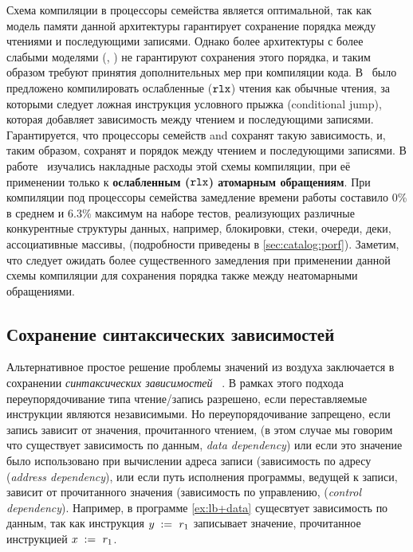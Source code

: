 Схема компиляции в процессоры семейства \Intel
является оптимальной, так как модель памяти данной 
архитектуры гарантирует сохранение порядка 
между чтениями и последующими записями. 
Однако более архитектуры с более слабыми моделями (\ARM, \POWER)
не гарантируют сохранения этого порядка, 
и таким образом требуют принятия дополнительных мер при компиляции кода. 
В~\cite{Boehm-Demsky:MSPC14} было предложено компилировать 
ослабленные ($\mathtt{rlx}$) чтения как обычные чтения, 
за которыми следует ложная инструкция условного прыжка 
(conditional jump), которая добавляет зависимость 
между чтением и последующими записями. 
Гарантируется, что процессоры семейств \ARM and \POWER 
сохранят такую зависимость, и, таким образом, 
сохранят и порядок между чтением и последующими записями. 
В работе~\cite{Ou-Demsky:OOPSLA18} изучались 
накладные расходы этой схемы компиляции, 
при её применении только к \textbf{ослабленным ($\mathtt{rlx}$) атомарным обращениям}.
При компиляции под процессоры семейства  
замедление времени работы составило 0\% в среднем и 6.3\% максимум 
на наборе тестов, реализующих различные конкурентные 
структуры данных, например, блокировки, стеки, очереди, 
деки, ассоциативные массивы, \etc
(подробности приведены в \ref{sec:catalog:porf}).
Заметим, что следует ожидать более существенного замедления
при применении данной схемы компиляции для 
сохранения порядка также между неатомарными обращениями. 

\subsection{Сохранение синтаксических зависимостей}
\label{sec:analysis:deprf}

Альтернативное простое решение проблемы значений из воздуха 
заключается в сохранении \emph{синтаксических зависимостей}~%
\cite{Boehm-Demsky:MSPC14, Alglave-al:ASPLOS18}.
В рамках этого подхода переупорядочивание типа чтение/запись 
разрешено, если переставляемые инструкции являются независимыми. 
Но переупорядочивание запрещено, если запись зависит 
от значения, прочитанного чтением, 
(в этом случае мы говорим что существует зависимость по данным, \emph{data dependency})
или если это значение было использовано при вычислении адреса записи 
(зависимость по адресу (\emph{address dependency}), 
или если путь исполнения программы, ведущей к записи, 
зависит от прочитанного значения 
(зависимость по управлению, (\emph{control dependency}).
Например, в программе \ref{ex:lb+data} 
сущесвтует зависимость по данным, так как 
инструкция $y\;:=_{}\;r_1$ записывает 
значение, прочитанное инструкцией $x\;:=_{}\;r_1$. 

